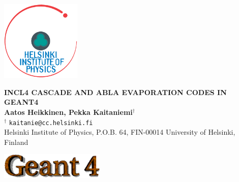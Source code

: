 \documentclass[20pt]{article}
\newlength{\bgwidth}
\newlength{\bgheight}
\begin{document}
\huge
\begin{center}



\vspace{-1in}
	\parbox[c]{1.4cm}{\includegraphics[width=3.8cm]{images/hiplogo.eps}}
	\hspace{0.6cm}
   \parbox[c]{0.8\linewidth}{
		\begin{center}
			\textbf{\Huge INCL4 CASCADE AND ABLA EVAPORATION CODES IN GEANT4} \\[0.5em]
			\textbf{\LARGE Aatos Heikkinen, Pekka Kaitaniemi$^{\dagger}$} \\[0.3em]
			{\Large $^{\dagger}$ {\tt kaitanie@cc.helsinki.fi}} \\
                        {\textsc Helsinki Institute of Physics, P.O.B. 64, FIN-00014 University of Helsinki, Finland}
                        \vskip2cm
		\end{center}
	}
	\parbox[c]{5.3cm}{\includegraphics[width=5cm]{images/g4logo.eps}}


\end{center}
\end{document}

